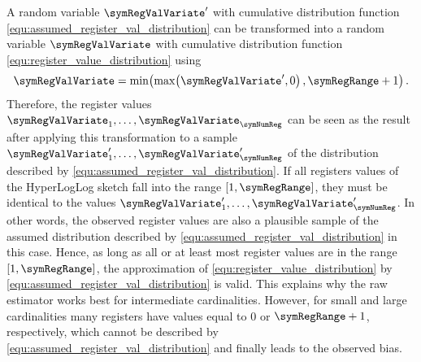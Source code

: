 \documentclass[a4paper]{scrartcl}
\begin{document}
A random variable $\symRegValVariate'$ with cumulative distribution function \eqref{equ:assumed_register_val_distribution} can be transformed into a random variable $\symRegValVariate$ with cumulative distribution function \eqref{equ:register_value_distribution} using
\begin{equation}
\label{equ:dist_transformation}
\symRegValVariate = \min\!\left(\max\!\left(\symRegValVariate',0\right), \symRegRange+1\right).
\end{equation}
Therefore, the register values $\symRegValVariate_1,\ldots,\symRegValVariate_\symNumReg$ can be seen as the result after applying this transformation to a sample $\symRegValVariate'_1,\ldots,\symRegValVariate'_\symNumReg$ of the distribution described by \eqref{equ:assumed_register_val_distribution}. If all registers values of the HyperLogLog sketch fall into the range $[1,\symRegRange]$, they must  be identical to the values $\symRegValVariate'_1,\ldots,\symRegValVariate'_\symNumReg$. In other words, the observed register values are also a plausible sample of the assumed distribution described by \eqref{equ:assumed_register_val_distribution} in this case. Hence, as long as all or at least most register values are in the range $[1,\symRegRange]$, the approximation of \eqref{equ:register_value_distribution} by \eqref{equ:assumed_register_val_distribution} is valid. This explains why the raw estimator works best for intermediate cardinalities. However, for small and large cardinalities many registers have values equal to 0 or $\symRegRange+1$, respectively, which cannot be described by \eqref{equ:assumed_register_val_distribution} and finally leads to the observed bias.
\end{document}
